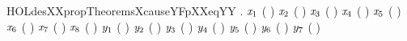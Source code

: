 \newcommand{\HOLdesXXpropTheoremsXcauseYFpXXeq}{\UseVerbatim{HOLdesXXpropTheoremsXcauseYFpXXeq}}
\begin{SaveVerbatim}{HOLdesXXpropTheoremsXcauseYFpXXeqYY}
\HOLTokenTurnstile{} \HOLSymConst{\HOLTokenForall{}} .
      \HOLSymConst{=}   \HOLSymConst{\HOLTokenConj{}} \ensuremath{\HOLFreeVar{x}\sb{\mathrm{1}}} \HOLSymConst{=} ( \HOLSymConst{\HOLTokenExtract{}} )  \HOLSymConst{\HOLTokenConj{}} \ensuremath{\HOLFreeVar{x}\sb{\mathrm{2}}} \HOLSymConst{=} ( \HOLSymConst{\HOLTokenExtract{}} )  \HOLSymConst{\HOLTokenConj{}}
     \ensuremath{\HOLFreeVar{x}\sb{\mathrm{3}}} \HOLSymConst{=} ( \HOLSymConst{\HOLTokenExtract{}} )  \HOLSymConst{\HOLTokenConj{}} \ensuremath{\HOLFreeVar{x}\sb{\mathrm{4}}} \HOLSymConst{=} ( \HOLSymConst{\HOLTokenExtract{}} )  \HOLSymConst{\HOLTokenConj{}}
     \ensuremath{\HOLFreeVar{x}\sb{\mathrm{5}}} \HOLSymConst{=} ( \HOLSymConst{\HOLTokenExtract{}} )  \HOLSymConst{\HOLTokenConj{}} \ensuremath{\HOLFreeVar{x}\sb{\mathrm{6}}} \HOLSymConst{=} ( \HOLSymConst{\HOLTokenExtract{}} )  \HOLSymConst{\HOLTokenConj{}}
     \ensuremath{\HOLFreeVar{x}\sb{\mathrm{7}}} \HOLSymConst{=} ( \HOLSymConst{\HOLTokenExtract{}} )  \HOLSymConst{\HOLTokenConj{}} \ensuremath{\HOLFreeVar{x}\sb{\mathrm{8}}} \HOLSymConst{=} ( \HOLSymConst{\HOLTokenExtract{}} )  \HOLSymConst{\HOLTokenConj{}} \ensuremath{\HOLFreeVar{y}\sb{\mathrm{1}}} \HOLSymConst{=} ( \HOLSymConst{\HOLTokenExtract{}} )  \HOLSymConst{\HOLTokenConj{}}
     \ensuremath{\HOLFreeVar{y}\sb{\mathrm{2}}} \HOLSymConst{=} ( \HOLSymConst{\HOLTokenExtract{}} )  \HOLSymConst{\HOLTokenConj{}} \ensuremath{\HOLFreeVar{y}\sb{\mathrm{3}}} \HOLSymConst{=} ( \HOLSymConst{\HOLTokenExtract{}} )  \HOLSymConst{\HOLTokenConj{}} \ensuremath{\HOLFreeVar{y}\sb{\mathrm{4}}} \HOLSymConst{=} ( \HOLSymConst{\HOLTokenExtract{}} )  \HOLSymConst{\HOLTokenConj{}}
     \ensuremath{\HOLFreeVar{y}\sb{\mathrm{5}}} \HOLSymConst{=} ( \HOLSymConst{\HOLTokenExtract{}} )  \HOLSymConst{\HOLTokenConj{}} \ensuremath{\HOLFreeVar{y}\sb{\mathrm{6}}} \HOLSymConst{=} ( \HOLSymConst{\HOLTokenExtract{}} )  \HOLSymConst{\HOLTokenConj{}} \ensuremath{\HOLFreeVar{y}\sb{\mathrm{7}}} \HOLSymConst{=} ( \HOLSymConst{\HOLTokenExtract{}} )  \HOLSymConst{\HOLTokenConj{}}

\end{SaveVerbatim}
